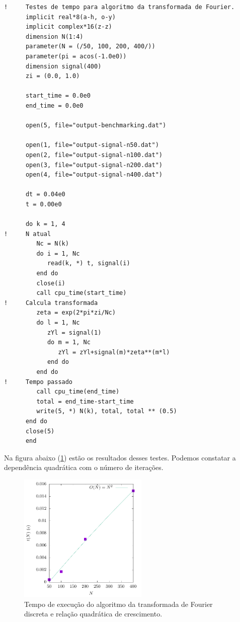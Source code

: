 \documentclass[a4paper, 11pt]{article}
\begin{document}
\begin{verbatim}
!     Testes de tempo para algoritmo da transformada de Fourier.
      implicit real*8(a-h, o-y)
      implicit complex*16(z-z)
      dimension N(1:4)
      parameter(N = (/50, 100, 200, 400/))
      parameter(pi = acos(-1.0e0))
      dimension signal(400)
      zi = (0.0, 1.0)

      start_time = 0.0e0
      end_time = 0.0e0

      open(5, file="output-benchmarking.dat")

      open(1, file="output-signal-n50.dat")
      open(2, file="output-signal-n100.dat")
      open(3, file="output-signal-n200.dat")
      open(4, file="output-signal-n400.dat")

      dt = 0.04e0
      t = 0.00e0

      do k = 1, 4
!     N atual
         Nc = N(k)
         do i = 1, Nc 
            read(k, *) t, signal(i)
         end do
         close(i)
         call cpu_time(start_time)
!     Calcula transformada
         zeta = exp(2*pi*zi/Nc)
         do l = 1, Nc
            zYl = signal(1)
            do m = 1, Nc
               zYl = zYl+signal(m)*zeta**(m*l)
            end do
         end do
!     Tempo passado
         call cpu_time(end_time)
         total = end_time-start_time
         write(5, *) N(k), total, total ** (0.5)
      end do
      close(5)
      end
\end{verbatim}


Na figura abaixo (\ref{fig:tempo_execucao}) estão os resultados desses testes. Podemos
constatar a dependência quadrática com o número de iterações.



\begin{figure}[h!]
  \centering
  \includegraphics[width=0.55\textwidth]{benchmarking2}
  \caption{Tempo de execução do algoritmo da transformada de Fourier discreta e relação quadrática de crescimento.}
  \label{fig:tempo_execucao}
\end{figure}
\end{document}
